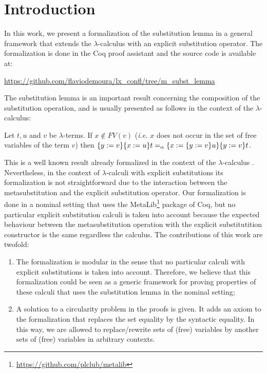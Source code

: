 \begin{coqdoccode}
\coqdocemptyline
\end{coqdoccode}
\section{Introduction}



 In this work, we present a formalization of the substitution lemma\cite{barendregtLambdaCalculusIts1984} in a general framework that extends the $\lambda$-calculus with an explicit substitution operator. The formalization is done in the Coq proof assistant\cite{teamCoqProofAssistant2021} and the source code is available at: \vspace{0.25cm}


 \url{https://github.com/flaviodemoura/lx_confl/tree/m_subst_lemma} \vspace{0.25cm}


The substitution lemma is an important result concerning the composition of the substitution operation, and is usually presented as follows in the context of the $\lambda$-calculus:


\begin{tcolorbox}
 Let $t,u$ and $v$ be $\lambda$-terms. If $x\notin FV(v)$ ({\it i.e.} $x$ does not occur in the set of free variables of the term $v$) then $\metasub{\metasub{t}{x}{u}}{y}{v} =_\alpha \metasub{\metasub{t}{y}{v}}{x}{\metasub{u}{y}{v}}$.
\end{tcolorbox}


This is a well known result already formalized in the context of the $\lambda$-calculus \cite{berghoferHeadtoHeadComparisonBruijn2007}. Nevertheless, in the context of $\lambda$-calculi with explicit substitutions its formalization is not straightforward due to the interaction between the metasubstitution and the explicit substitution operator. Our formalization is done in a nominal setting that uses the MetaLib\footnote{\url{https://github.com/plclub/metalib}} package of Coq, but no particular explicit substitution calculi is taken into account because the expected behaviour between the metasubstitution operation with the explicit substitutition constructor is the same regardless the calculus. The contributions of this work are twofold:


\begin{enumerate}
\item The formalization is modular in the sense that no particular calculi with explicit substitutions is taken into account. Therefore, we believe that this formalization could be seen as a generic framework for proving properties of these calculi that uses the substitution lemma in the nominal setting\cite{kesnerPerpetualityFullSafe2008,nakazawaCompositionalConfluenceProofs2016,nakazawaPropertyShufflingCalculus2023};
\item A solution to a circularity problem in the proofs is given. It adds an axiom to the formalization that replaces the set equality by the syntactic equality. In this way, we are allowed to replace/rewrite sets of (free) variables by another sets of (free) variables in arbitrary contexts.
\end{enumerate}


